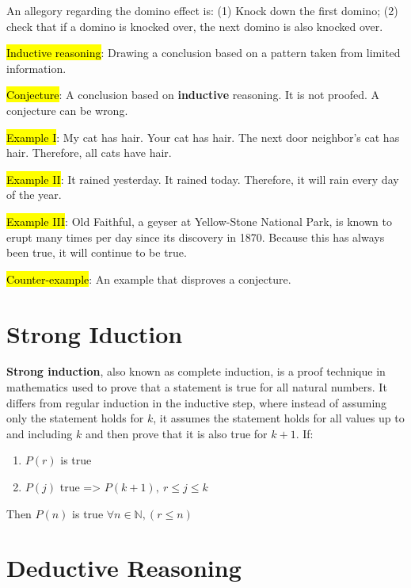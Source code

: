 An allegory regarding the domino effect is: (1) Knock down the first domino; (2) check that if a domino is knocked over, the next domino is also knocked over.

\vspace{0.5cm}

\hl{Inductive reasoning}: Drawing a conclusion based on a pattern taken from limited information.

\hl{Conjecture}: A conclusion based on \textbf{inductive} reasoning. It is not proofed. A conjecture can be wrong.

\vspace{.3cm}

\hl{Example I}: My cat has hair. Your cat has hair. The next door neighbor's cat has hair. Therefore, all cats have hair.

\hl{Example II}: It rained yesterday. It rained today. Therefore, it will rain every day of the year.

\hl{Example III}: Old Faithful, a geyser at Yellow-Stone National Park, is known to erupt many times per day since its discovery in 1870. Because this has always been true, it will continue to be true.

\vspace{0.3cm}

\hl{Counter-example}: An example that disproves a conjecture.

\section{Strong Iduction}

\textbf{Strong induction}, also known as complete induction, is a proof technique in mathematics used to prove that a statement is true for all natural numbers. It differs from regular induction in the inductive step, where instead of assuming only the statement holds for \(k\), it assumes the statement holds for all values up to and including $k$ and then prove that it is also true for $k+1$. If:

\begin{enumerate}
  \item $P(r)$ is true
  \item $P(j)$ true => $P(k+1),\ r\leq j \leq k$
\end{enumerate}

Then $P(n)$ is true $\forall n\in \mathbb{N}, (r \leq n)$

\section{Deductive Reasoning}

